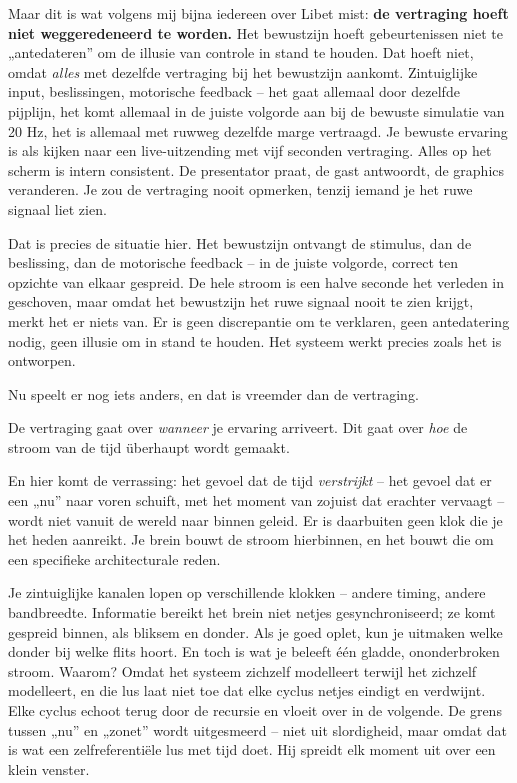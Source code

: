\documentclass[11pt, twoside, openright]{book}
\begin{document}
Maar dit is wat volgens mij bijna iedereen over Libet mist: \textbf{de vertraging hoeft niet weggeredeneerd te worden.} Het bewustzijn hoeft gebeurtenissen niet te „antedateren” om de illusie van controle in stand te houden. Dat hoeft niet, omdat \textit{alles} met dezelfde vertraging bij het bewustzijn aankomt. Zintuiglijke input, beslissingen, motorische feedback -- het gaat allemaal door dezelfde pijplijn, het komt allemaal in de juiste volgorde aan bij de bewuste simulatie van 20 Hz, het is allemaal met ruwweg dezelfde marge vertraagd. Je bewuste ervaring is als kijken naar een live-uitzending met vijf seconden vertraging. Alles op het scherm is intern consistent. De presentator praat, de gast antwoordt, de graphics veranderen. Je zou de vertraging nooit opmerken, tenzij iemand je het ruwe signaal liet zien.

Dat is precies de situatie hier. Het bewustzijn ontvangt de stimulus, dan de beslissing, dan de motorische feedback -- in de juiste volgorde, correct ten opzichte van elkaar gespreid. De hele stroom is een halve seconde het verleden in geschoven, maar omdat het bewustzijn het ruwe signaal nooit te zien krijgt, merkt het er niets van. Er is geen discrepantie om te verklaren, geen antedatering nodig, geen illusie om in stand te houden. Het systeem werkt precies zoals het is ontworpen.

Nu speelt er nog iets anders, en dat is vreemder dan de vertraging.

De vertraging gaat over \textit{wanneer} je ervaring arriveert. Dit gaat over \textit{hoe} de stroom van de tijd überhaupt wordt gemaakt.

En hier komt de verrassing: het gevoel dat de tijd \textit{verstrijkt} -- het gevoel dat er een „nu” naar voren schuift, met het moment van zojuist dat erachter vervaagt -- wordt niet vanuit de wereld naar binnen geleid. Er is daarbuiten geen klok die je het heden aanreikt. Je brein bouwt de stroom hierbinnen, en het bouwt die om een specifieke architecturale reden.

Je zintuiglijke kanalen lopen op verschillende klokken -- andere timing, andere bandbreedte. Informatie bereikt het brein niet netjes gesynchroniseerd; ze komt gespreid binnen, als bliksem en donder. Als je goed oplet, kun je uitmaken welke donder bij welke flits hoort. En toch is wat je beleeft één gladde, ononderbroken stroom. Waarom? Omdat het systeem zichzelf modelleert terwijl het zichzelf modelleert, en die lus laat niet toe dat elke cyclus netjes eindigt en verdwijnt. Elke cyclus echoot terug door de recursie en vloeit over in de volgende. De grens tussen „nu” en „zonet” wordt uitgesmeerd -- niet uit slordigheid, maar omdat dat is wat een zelfreferentiële lus met tijd doet. Hij spreidt elk moment uit over een klein venster.
\end{document}

